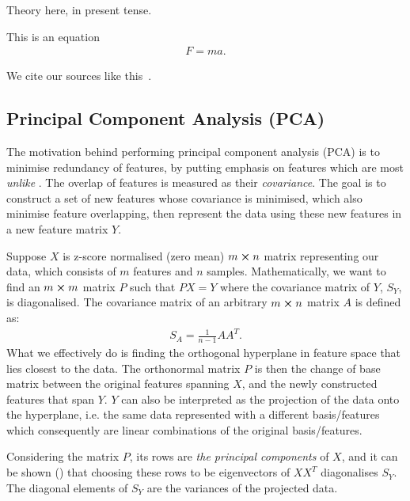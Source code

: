 Theory here, in present tense.

This is an equation
\begin{align} \label{theo:eq:newton2}
    F = ma.
\end{align}

We cite our sources like this~\citep{Project1}.

\subsection{Principal Component Analysis (PCA)}
    The motivation behind performing principal component analysis (PCA) is to minimise redundancy of features, by putting emphasis on features which are most \textit{unlike} . The overlap of features is measured as their \textit{covariance}. The goal is to construct a set of new features whose covariance is minimised, which also minimise feature overlapping, then represent the data using these new features in a new feature matrix $Y$. 
    

    Suppose $X$ is z-score normalised (zero mean) $m\cross n$ matrix representing our data, which consists of $m$ features and $n$ samples. Mathematically, we want to find an $m\cross m$ matrix $P$ such that $PX=Y$ where the covariance matrix of $Y$, $S_Y$, is diagonalised. The covariance matrix of an arbitrary $m\cross n$ matrix $A$ is defined as:
    \begin{align} \label{theo:eq:covariance_definition}
        S_A = \frac{1}{n-1}AA^T.
    \end{align}
    What we effectively do is finding the orthogonal hyperplane in feature space that lies closest to the data. The orthonormal matrix $P$ is then the change of base matrix between the original features spanning $X$, and the newly constructed features that span $Y$. $Y$ can also be interpreted as the projection of the data onto the hyperplane, i.e. the same data represented with a different basis/features which consequently are linear combinations of the original basis/features. 

    Considering the matrix $P$, its rows are \textit{the principal components} of $X$, and it can be shown () that choosing these rows to be eigenvectors of $XX^T$ diagonalises $S_Y$.  The diagonal elements of $S_Y$ are the variances of the projected data. 

